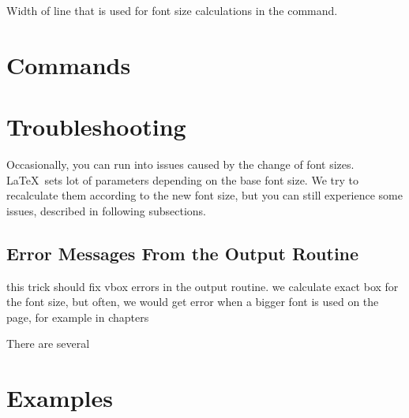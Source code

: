 \documentclass{ltxdoc}
\begin{document}
\noindent {} 

\noindent {} Width of line that is used for font size calculations in the \cmd{\setsizes} command.




\section{Commands}

\DescribeMacro\setsizes
\cmd\setsizes{}


\section{Troubleshooting}

Occasionally, you can run into issues caused by the change of font sizes. \LaTeX\ sets lot of parameters 
depending on the base font size. We try to recalculate them according to the new font size, but you can still
experience some issues, described in following subsections.

\subsection{Error Messages From the Output Routine }

this trick should fix vbox errors in the output routine. 
we calculate exact box for the font size, but often,
we would get error when a bigger font is used on the page,
for example in chapters

There are several 
  \def\@textbottom{\vskip \z@ \@plus \resp_font_size \@minus \resp_font_size}
\section{Examples}
\end{document}
